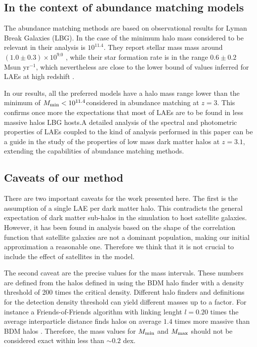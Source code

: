 \documentclass[usenatbib]{mn2e}
\newcommand{\hMsun}{{\ifmmode{h^{-1}{\rm
        {M_{\odot}}}}\else{$h^{-1}{\rm{M_{\odot}}}$}\fi}}
\begin{document}
\subsection{In the context of abundance matching models}


The abundance matching methods are based on observational results for
Lyman Break Galaxies \citep{Behroozi2013a,Behroozi2013b}  (LBG).  In
the case of \cite{Behroozi2013a} the minimum halo mass considered to
be relevant in their analysis is $10^{11.4}$\hMsun. They report
stellar mass mass around $(1.0\pm0.3)\times 10^{9.0}$ \hMsun, while
their star formation rate is in the range $0.6\pm 0.2$ Msun yr$^{-1}$,
which nevertheless are close to the lower bound of values inferred for
LAEs at high redshift \citep{Gawiser2007,Nilsson2009,Pentericci2009}. 

In our results, all the preferred models have a halo mass range lower
than the minimum of $M_{\rm min}<10^{11.4}$\hMsun considered in
abundance matching at $z=3$. This confirms once more the expectations
that most of  LAEs are to be found in less massive halos LBG hosts.A
detailed analysis of the spectral and photometric properties of LAEs
coupled to the kind of analysis performed in this paper can be a guide
in the study of the properties of low mass dark matter halos at
$z=3.1$, extending the capabilities of abundance matching methods.

\subsection{Caveats of our method}

There are two important caveats for the work presented here. The first is the
assumption of a single LAE per dark matter halo. This contradicts the
general expectation of dark matter sub-halos in the simulation to host
satellite galaxies. However, it has been found in analysis based on
the shape of the correlation function \citep{Jose2013b} that satellite
galaxies are not a dominant population, making our initial
approximation a reasonable one. Therefore we think that it is not
crucial to include the effect of satellites in the model.


The second caveat are the precise values for the mass intervals. These
numbers are defined from the halos defined in using the BDM halo
finder with a density threshold of 200 times the critical
density. Different halo finders and definitions for the detection
density threshold can yield different masses up to a factor. For
instance a Friends-of-Friends algorithm with linking lenght $l=0.20$
times the average interparticle distance finds halos on average $1.4$
times more massive than BDM halos \citep{Bolshoi}. Therefore, the mass
values for $M_{\rm min}$ and $M_{\rm max}$ should not be considered exact
within less than $\sim 0.2$ dex.
\end{document}
